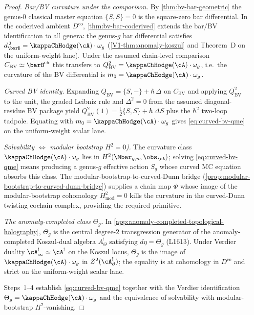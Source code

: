 \begin{proof}
\emph{Bar/BV curvature under the comparison.} By
\autoref{thm:bv-bar-geometric} the genus-$0$ classical master equation
$\{S,S\}=0$ is the square-zero bar differential. In the coderived
ambient $D^{\mathrm{co}}$, \autoref{thm:bv-bar-coderived} extends the
bar/BV identification to all genera: the genus-$g$ bar differential
satisfies $d_{\barB}^{\,2} = \kappaChHodge(\cA)\cdot\omega_g$
(\autoref{V1-thm:anomaly-koszul} and Theorem~D on the uniform-weight
lane). Under the assumed chain-level comparison $C_{\mathrm{BV}}\simeq
\barB^{\mathrm{ch}}$ this transfers to
$Q_{\mathrm{BV}}^{2} = \kappaChHodge(\cA)\cdot\omega_g$, i.e.\ the curvature
of the BV differential is $m_0 = \kappaChHodge(\cA)\cdot\omega_g$.

\emph{Curved BV identity.} Expanding
$Q_{\mathrm{BV}} = \{S,{-}\} + \hbar\,\Delta$ on
$C_{\mathrm{BV}}$ and applying $Q_{\mathrm{BV}}^{2}$ to the unit, the
graded Leibniz rule and $\Delta^{2}=0$ from the assumed
diagonal-residue BV package yield
$Q_{\mathrm{BV}}^{2}(1) = \tfrac{1}{2}\{S,S\} + \hbar\,\Delta S$
plus the $\hbar^{2}$ two-loop tadpole. Equating with
$m_0 = \kappaChHodge(\cA)\cdot\omega_g$ gives
\eqref{eq:curved-bv-qme} on the uniform-weight scalar lane.

\emph{Solvability $\Leftrightarrow$ modular bootstrap
$H^{2}=0$).} The curvature class
$\kappaChHodge(\cA)\cdot\omega_g$ lies in
$H^{2}(\Mbar_{g,n},\obs_{\cA})$; solving
\eqref{eq:curved-bv-qme} means producing a genus-$g$ effective
action $S_g$ whose curved MC equation absorbs this class. The
modular-bootstrap-to-curved-Dunn bridge
(\autoref{prop:modular-bootstrap-to-curved-dunn-bridge}) supplies a
chain map $\Phi$ whose image of the modular-bootstrap cohomology
$H^{2}_{\mathrm{mod}}=0$ kills the curvature in the curved-Dunn
twisting-cochain complex, providing the required primitive.

\emph{The anomaly-completed class $\Theta_g$.} In
\autoref{app:anomaly-completed-topological-holography}, $\Theta_g$ is
the central degree-$2$ transgression generator of the anomaly-completed
Koszul-dual algebra $A^{!}_{\Theta}$ satisfying
$d\eta = \Theta_g$ (L1613). Under Verdier duality
$\cA^{!}_{\infty}\simeq \cA^{!}$ on the Koszul locus,
$\Theta_g$ is the image of $\kappaChHodge(\cA)\cdot\omega_g$ in
$Z^{2}(\cA^{!}_{\partial})$; the equality is at cohomology in
$D^{\mathrm{co}}$ and strict on the uniform-weight scalar lane.

Steps~1--4 establish \eqref{eq:curved-bv-qme} together with the
Verdier identification $\Theta_g = \kappaChHodge(\cA)\cdot\omega_g$ and the
equivalence of solvability with modular-bootstrap
$H^{2}$-vanishing.
\end{proof}

